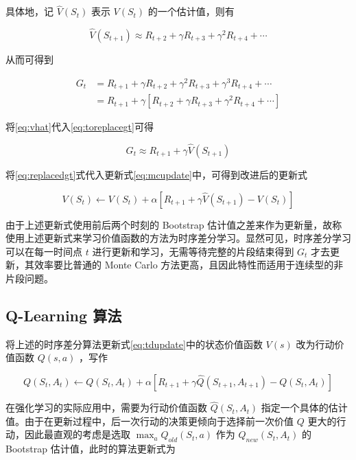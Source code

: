 具体地，记 $\widehat{V}(S_{t})$ 表示 $V({S_t})$ 的一个估计值，则有

\begin{equation}\label{eq:vhat}
    \widehat{V}(S_{t+1}) \approx R_{t+2} + \gamma R_{t+3} + \gamma^2 R_{t+4} + \cdots
\end{equation}

从而可得到

\begin{equation}\label{eq:toreplacegt}
    \begin{aligned}
        G_t &= R_{t+1}+\gamma R_{t+2}+\gamma^2 R_{t+3}+\gamma^3 R_{t+4}+\cdots\\
        &=R_{t+1}+\gamma\left[R_{t+2}+\gamma R_{t+3}+\gamma^2 R_{t+4}+\cdots\right]
    \end{aligned}
\end{equation}

将\ref{eq:vhat}代入\ref{eq:toreplacegt}可得

\begin{equation}\label{eq:replacedgt}
    G_t \approx R_{t+1} +\gamma \widehat{V}(S_{t+1})
\end{equation}

将\ref{eq:replacedgt}式代入更新式\ref{eq:mcupdate}中，可得到改进后的更新式

\begin{equation}\label{eq:tdupdate}
    V(S_t)\leftarrow V(S_t)+\alpha\left[R_{t+1}+\gamma \widehat{V}(S_{t+1})-V(S_t)\right]
\end{equation}

由于上述更新式使用前后两个时刻的 Bootstrap 估计值之差来作为更新量，故称使用上述更新式来学习价值函数的方法为{\jiacu 时序差分学习}。显然可见，时序差分学习可以在每一时间点 $t$ 进行更新和学习，无需等待完整的片段结束得到 $G_t$ 才去更新，其效率要比普通的 Monte Carlo 方法更高，且因此特性而适用于连续型的非片段问题。

\subsection{Q-Learning 算法}

将上述的时序差分算法更新式\ref{eq:tdupdate}中的状态价值函数 $V(s)$ 改为行动价值函数 $Q(s,a)$ ，写作

\begin{equation}
    Q(S_t,A_t)\leftarrow Q(S_t,A_t)+\alpha\left[R_{t+1}+\gamma \widehat{Q}(S_{t+1},A_{t+1})-Q(S_t,A_t)\right]
\end{equation}

在强化学习的实际应用中，需要为行动价值函数 $\widehat{Q}(S_t,A_t)$ 指定一个具体的估计值。由于在更新过程中，后一次行动的决策更倾向于选择前一次价值 $Q$ 更大的行动，因此最直观的考虑是选取 $\max_a Q_{old}(S_t,a)$ 作为 $Q_{new}(S_t,A_t)$ 的 Bootstrap 估计值，此时的算法更新式为

